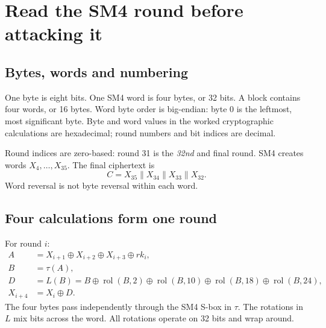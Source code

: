 \documentclass[11pt,a4paper]{report}
\newcommand{\xor}{\mathbin{\oplus}}
\newcommand{\rol}{\operatorname{rol}}
\begin{document}
\chapter{Read the SM4 round before attacking it}
\section{Bytes, words and numbering}
One byte is eight bits. One SM4 word is four bytes, or 32 bits. A block contains four words, or 16 bytes. Word byte order is big-endian: byte 0 is the leftmost, most significant byte.
Byte and word values in the worked cryptographic calculations are hexadecimal; round numbers and bit indices are decimal.
\begin{center}
\end{center}
Round indices are zero-based: round 31 is the \emph{32nd} and final round. SM4 creates words \(X_4,\ldots,X_{35}\). The final ciphertext is
\[C=X_{35}\parallel X_{34}\parallel X_{33}\parallel X_{32}.\]
Word reversal is not byte reversal within each word.

\section{Four calculations form one round}
For round \(i\):
\begin{align*}
A&=X_{i+1}\xor X_{i+2}\xor X_{i+3}\xor rk_i,\\
B&=\tau(A),\\
D&=L(B)=B\xor\rol(B,2)\xor\rol(B,10)\xor\rol(B,18)\xor\rol(B,24),\\
X_{i+4}&=X_i\xor D.
\end{align*}
The four bytes pass independently through the SM4 S-box in \(\tau\). The rotations in \(L\) mix bits across the word. All rotations operate on 32 bits and wrap around.
\begin{center}
\end{center}
\end{document}
